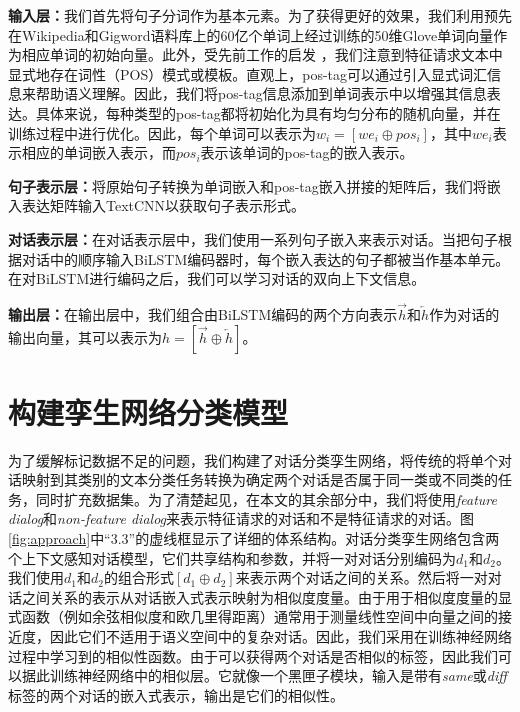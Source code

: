 \textbf{输入层：}我们首先将句子分词作为基本元素。为了获得更好的效果，我们利用预先在Wikipedia和Gigword语料库上的60亿个单词上经过训练的50维Glove单词向量\cite{pennington2014glove}作为相应单词的初始向量。此外，受先前工作的启发\cite{Sorbo2016Development} \cite{shi2017understanding}，我们注意到特征请求文本中显式地存在词性（POS）模式或模板。直观上，pos-tag可以通过引入显式词汇信息来帮助语义理解。因此，我们将pos-tag信息添加到单词表示中以增强其信息表达。具体来说，每种类型的pos-tag都将初始化为具有均匀分布的随机向量，并在训练过程中进行优化。因此，每个单词可以表示为$w_i=[we_i\oplus pos_i]$，其中$we_i$表示相应的单词嵌入表示，而$pos_i$表示该单词的pos-tag的嵌入表示。

\textbf{句子表示层：}将原始句子转换为单词嵌入和pos-tag嵌入拼接的矩阵后，我们将嵌入表达矩阵输入TextCNN以获取句子表示形式。

\textbf{对话表示层：}在对话表示层中，我们使用一系列句子嵌入来表示对话。当把句子根据对话中的顺序输入BiLSTM编码器时，每个嵌入表达的句子都被当作基本单元。在对BiLSTM进行编码之后，我们可以学习对话的双向上下文信息。

\textbf{输出层：}在输出层中，我们组合由BiLSTM编码的两个方向表示$\overrightarrow{h}$和$\overleftarrow{h}$作为对话的输出向量，其可以表示为$h=[\overrightarrow{h}\oplus \overleftarrow{h}]$。

\section{构建孪生网络分类模型}
为了缓解标记数据不足的问题，我们构建了对话分类孪生网络，将传统的将单个对话映射到其类别的文本分类任务转换为确定两个对话是否属于同一类或不同类的任务，同时扩充数据集。为了清楚起见，在本文的其余部分中，我们将使用\textit{feature dialog}和\textit{non-feature dialog}来表示特征请求的对话和不是特征请求的对话。图\ref{fig:approach}中“3.3”的虚线框显示了详细的体系结构。对话分类孪生网络包含两个上下文感知对话模型，它们共享结构和参数，并将一对对话分别编码为$d_1$和$d_2$。我们使用$d_1$和$d_2$的组合形式$[{d_1}\oplus {d_2}]$来表示两个对话之间的关系。然后将一对对话之间关系的表示从对话嵌入式表示映射为相似度度量。由于用于相似度度量的显式函数（例如余弦相似度和欧几里得距离\cite{huang2008similarity}）通常用于测量线性空间中向量之间的接近度，因此它们不适用于语义空间中的复杂对话。因此，我们采用在训练神经网络过程中学习到的相似性函数。由于可以获得两个对话是否相似的标签，因此我们可以据此训练神经网络中的相似层。它就像一个黑匣子模块，输入是带有\textit{same}或\textit{diff}标签的两个对话的嵌入式表示，输出是它们的相似性。


